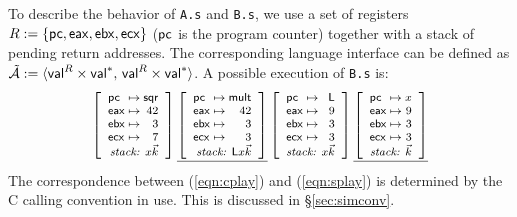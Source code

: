 \begin{example}
To describe the behavior of \texttt{A.s} and \texttt{B.s},
we use a set of registers
$R := \{  \mathsf{pc} ,  \mathsf{eax} ,  \mathsf{ebx} ,  \mathsf{ecx}  \}$
($ \mathsf{pc} $ is the program counter)
together with a stack of pending return addresses.
The corresponding language interface can be defined as
$\tilde{\mathcal{A}} :=
 \langle  \mathsf{val} ^R \times  \mathsf{val} ^*, \,
          \mathsf{val} ^R \times  \mathsf{val} ^* \rangle$.
A possible execution of \texttt{B.s}
is: %
\begin{equation} \label{eqn:splay}
{
  \footnotesize
  \left[
    \begin{array}{l@{{} \mapsto {}}r}
      \kw{pc}  & \kw{sqr} \\
      \kw{eax} & 42 \\
      \kw{ebx} & 3 \\
      \kw{ecx} & 7 \\
      \multicolumn{2}{r}{\textit{stack: } x \vec{k}}
    \end{array}
  \right] %
  \underline{
    \left[
      \begin{array}{l@{{} \mapsto {}}r}
        \kw{pc}  & \kw{mult} \\
        \kw{eax} & 42 \\
        \kw{ebx} & 3 \\
        \kw{ecx} & 3 \\
        \multicolumn{2}{r}{\textit{stack: } \kw{L} x \vec{k}}
      \end{array}
    \right]} %
  \left[
    \begin{array}{l@{{} \mapsto {}}r}
      \kw{pc}  & \kw{L} \\
      \kw{eax} & 9 \\
      \kw{ebx} & 3 \\
      \kw{ecx} & 3 \\
      \multicolumn{2}{r}{\textit{stack: } x \vec{k}}
    \end{array}
  \right] %
  \underline{
    \left[
      \begin{array}{l@{{} \mapsto {}}r}
        \kw{pc}  & x \\
        \kw{eax} & 9 \\
        \kw{ebx} & 3 \\
        \kw{ecx} & 3 \\
        \multicolumn{2}{r}{\textit{stack: } \vec{k}}
      \end{array}
    \right]}
}
\end{equation}
The correspondence between (\ref{eqn:cplay}) and (\ref{eqn:splay})
is determined by the C calling convention in use.
This is discussed in \S\ref{sec:simconv}.
\end{example}

